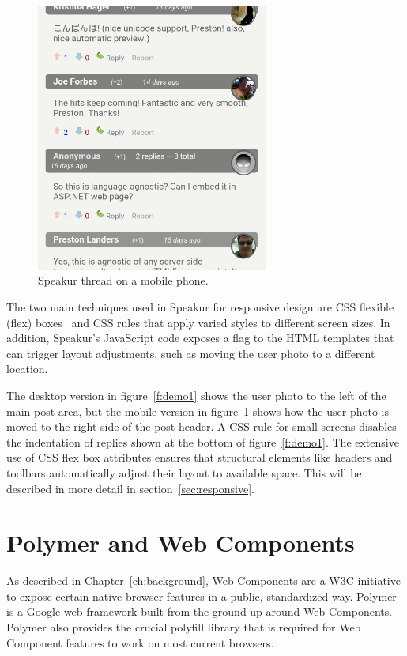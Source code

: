 \begin{figure}[htb]
\centering
 \includegraphics[width=3in]{images/mobile2.png}
\caption{Speakur thread on a mobile phone.}
\label{f:mobile1}
\end{figure}

The two main techniques used in Speakur for responsive design are CSS flexible (flex) boxes~\cite{mozillacontributors2015} 
and CSS  rules that apply varied styles to different screen sizes. 
In addition, Speakur's JavaScript code exposes a  flag to the HTML templates that can trigger layout adjustments, 
such as moving the user photo to a different location.

The desktop version in figure~\ref{f:demo1} shows the user photo to the left of the main post area, 
but the mobile version in figure~\ref{f:mobile1} shows how the user photo is moved to the right side of the post header. 
A CSS  rule for small screens disables the indentation of replies shown at the bottom of figure~\ref{f:demo1}. 
The extensive use of CSS flex box attributes ensures that structural elements like headers and toolbars automatically adjust their layout to available space. 
This will be described in more detail in section~\ref{sec:responsive}.

\section{Polymer and Web Components}
As described in Chapter~\ref{ch:background}, 
Web Components are a 
W3C initiative 
to expose certain native browser features in a public, standardized way. 
Polymer is a 
Google 
web framework built from the ground up around Web Components.
Polymer also provides the crucial 
polyfill library 
that is required for Web Component features to work on most current browsers.

